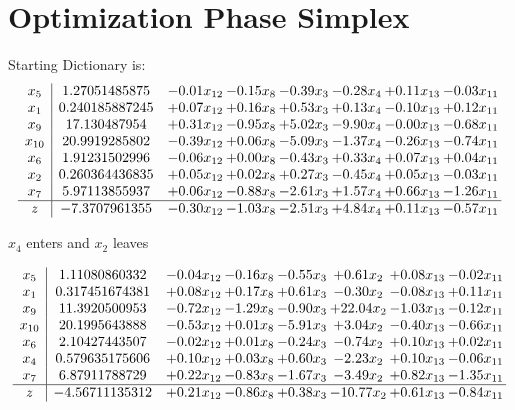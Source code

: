 \documentclass[9pt]{article}
\begin{document}
\section{Optimization Phase Simplex}
Starting Dictionary is:
\[\begin{array}{c| c c@{\hskip 2pt} c@{\hskip 2pt} c@{\hskip 2pt} c@{\hskip 2pt} c@{\hskip 2pt} c@{\hskip 2pt} }
 x_{5}   &  1.27051485875 & -0.01 x_{12} & -0.15 x_{8} & -0.39 x_{3} & -0.28 x_{4} & +  0.11 x_{13} & -0.03 x_{11}\\
 x_{1}   &  0.240185887245 & +  0.07 x_{12} & +  0.16 x_{8} & +  0.53 x_{3} & +  0.13 x_{4} & -0.10 x_{13} & +  0.12 x_{11}\\
 x_{9}   &  17.130487954 & +  0.31 x_{12} & -0.95 x_{8} & +  5.02 x_{3} & -9.90 x_{4} & -0.00 x_{13} & -0.68 x_{11}\\
 x_{10}   &  20.9919285802 & -0.39 x_{12} & +  0.06 x_{8} & -5.09 x_{3} & -1.37 x_{4} & -0.26 x_{13} & -0.74 x_{11}\\
 x_{6}   &  1.91231502996 & -0.06 x_{12} & +  0.00 x_{8} & -0.43 x_{3} & +  0.33 x_{4} & +  0.07 x_{13} & +  0.04 x_{11}\\
 x_{2}   &  0.260364436835 & +  0.05 x_{12} & +  0.02 x_{8} & +  0.27 x_{3} & -0.45 x_{4} & +  0.05 x_{13} & -0.03 x_{11}\\
 x_{7}   &  5.97113855937 & +  0.06 x_{12} & -0.88 x_{8} & -2.61 x_{3} & +  1.57 x_{4} & +  0.66 x_{13} & -1.26 x_{11}\\
\hline
z    &  -7.3707961355 & -0.30 x_{12} & -1.03 x_{8} & -2.51 x_{3} & +  4.84 x_{4} & +  0.11 x_{13} & -0.57 x_{11}\\
\end{array}\]


 $ x_{4} $ enters and $ x_{2} $ leaves 

 \[\begin{array}{c| c c@{\hskip 2pt} c@{\hskip 2pt} c@{\hskip 2pt} c@{\hskip 2pt} c@{\hskip 2pt} c@{\hskip 2pt} }
 x_{5}   &  1.11080860332 & -0.04 x_{12} & -0.16 x_{8} & -0.55 x_{3} & +  0.61 x_{2} & +  0.08 x_{13} & -0.02 x_{11}\\
 x_{1}   &  0.317451674381 & +  0.08 x_{12} & +  0.17 x_{8} & +  0.61 x_{3} & -0.30 x_{2} & -0.08 x_{13} & +  0.11 x_{11}\\
 x_{9}   &  11.3920500953 & -0.72 x_{12} & -1.29 x_{8} & -0.90 x_{3} & + 22.04 x_{2} & -1.03 x_{13} & -0.12 x_{11}\\
 x_{10}   &  20.1995643888 & -0.53 x_{12} & +  0.01 x_{8} & -5.91 x_{3} & +  3.04 x_{2} & -0.40 x_{13} & -0.66 x_{11}\\
 x_{6}   &  2.10427443507 & -0.02 x_{12} & +  0.01 x_{8} & -0.24 x_{3} & -0.74 x_{2} & +  0.10 x_{13} & +  0.02 x_{11}\\
 x_{4}   &  0.579635175606 & +  0.10 x_{12} & +  0.03 x_{8} & +  0.60 x_{3} & -2.23 x_{2} & +  0.10 x_{13} & -0.06 x_{11}\\
 x_{7}   &  6.87911788729 & +  0.22 x_{12} & -0.83 x_{8} & -1.67 x_{3} & -3.49 x_{2} & +  0.82 x_{13} & -1.35 x_{11}\\
\hline
z    &  -4.56711135312 & +  0.21 x_{12} & -0.86 x_{8} & +  0.38 x_{3} & -10.77 x_{2} & +  0.61 x_{13} & -0.84 x_{11}\\
\end{array}\]
\end{document}
